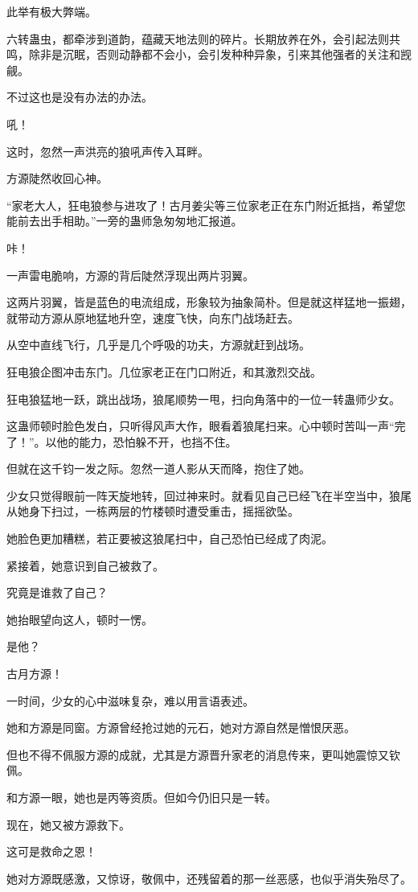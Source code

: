 \begin{this_body}
此举有极大弊端。

六转蛊虫，都牵涉到道韵，蕴藏天地法则的碎片。长期放养在外，会引起法则共鸣，除非是沉眠，否则动静都不会小，会引发种种异象，引来其他强者的关注和觊觎。

不过这也是没有办法的办法。

吼！

这时，忽然一声洪亮的狼吼声传入耳畔。

方源陡然收回心神。

“家老大人，狂电狼参与进攻了！古月姜尖等三位家老正在东门附近抵挡，希望您能前去出手相助。”一旁的蛊师急匆匆地汇报道。

咔！

一声雷电脆响，方源的背后陡然浮现出两片羽翼。

这两片羽翼，皆是蓝色的电流组成，形象较为抽象简朴。但是就这样猛地一振翅，就带动方源从原地猛地升空，速度飞快，向东门战场赶去。

从空中直线飞行，几乎是几个呼吸的功夫，方源就赶到战场。

狂电狼企图冲击东门。几位家老正在门口附近，和其激烈交战。

狂电狼猛地一跃，跳出战场，狼尾顺势一甩，扫向角落中的一位一转蛊师少女。

这蛊师顿时脸色发白，只听得风声大作，眼看着狼尾扫来。心中顿时苦叫一声“完了！”。以他的能力，恐怕躲不开，也挡不住。

但就在这千钧一发之际。忽然一道人影从天而降，抱住了她。

少女只觉得眼前一阵天旋地转，回过神来时。就看见自己已经飞在半空当中，狼尾从她身下扫过，一栋两层的竹楼顿时遭受重击，摇摇欲坠。

她脸色更加糟糕，若正要被这狼尾扫中，自己恐怕已经成了肉泥。

紧接着，她意识到自己被救了。

究竟是谁救了自己？

她抬眼望向这人，顿时一愣。

是他？

古月方源！

一时间，少女的心中滋味复杂，难以用言语表述。

她和方源是同窗。方源曾经抢过她的元石，她对方源自然是憎恨厌恶。

但也不得不佩服方源的成就，尤其是方源晋升家老的消息传来，更叫她震惊又钦佩。

和方源一眼，她也是丙等资质。但如今仍旧只是一转。

现在，她又被方源救下。

这可是救命之恩！

她对方源既感激，又惊讶，敬佩中，还残留着的那一丝恶感，也似乎消失殆尽了。


\end{this_body}
